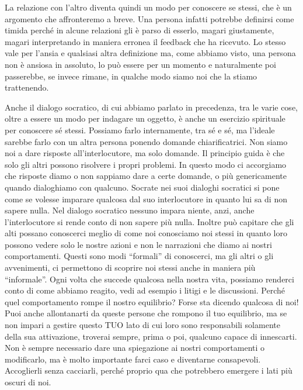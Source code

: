 \documentclass[12pt]{book} %
\begin{document}
\bigskip

La relazione con l'altro diventa quindi un modo per conoscere se stessi, che è un argomento che
affronteremo a breve. Una persona infatti potrebbe definirsi come timida perché in alcune relazioni gli è parso di
esserlo, magari giustamente, magari interpretando in maniera erronea il feedback che ha ricevuto. Lo stesso vale per
l'ansia e qualsiasi altra definizione ma, come abbiamo visto, una persona non è ansiosa in
assoluto, lo può essere per un momento e naturalmente poi passerebbe, se invece rimane, in qualche modo siamo noi che
la stiamo trattenendo.


\bigskip

Anche il dialogo socratico, di cui abbiamo parlato in precedenza, tra le varie cose, oltre a essere un modo per indagare
un oggetto, è anche un esercizio spirituale per conoscere sé stessi. Possiamo farlo internamente, tra sé e sé, ma
l'ideale sarebbe farlo con un altra persona ponendo domande chiarificatrici. Non siamo noi a dare
risposte all'interlocutore, ma solo domande. Il principio guida è che solo gli altri possono
risolvere i propri problemi. In questo modo ci accorgiamo che risposte diamo o non sappiamo dare a certe domande, o più
genericamente quando dialoghiamo con qualcuno. Socrate nei suoi dialoghi socratici si pone come se volesse imparare
qualcosa dal suo interlocutore in quanto lui sa di non sapere nulla. Nel dialogo socratico nessuno impara niente, anzi,
anche l'interlocutore si rende conto di non sapere più nulla. Inoltre può capitare che gli alti possano conoscerci
meglio di come noi conosciamo noi stessi in quanto loro possono vedere solo le nostre azioni e non le narrazioni che
diamo ai nostri comportamenti. Questi sono modi “formali” di conoscerci, ma gli altri o gli avvenimenti, ci permettono
di scoprire noi stessi anche in maniera più “informale”. Ogni volta che succede qualcosa nella nostra vita, possiamo
renderci conto di come abbiamo reagito, vedi ad esempio i litigi e le discussioni. Perché quel comportamento rompe il
nostro equilibrio? Forse sta dicendo qualcosa di noi! Puoi anche allontanarti da queste persone che rompono il tuo
equilibrio, ma se non impari a gestire questo TUO lato di cui loro sono responsabili solamente della sua attivazione,
troverai sempre, prima o poi, qualcuno capace di innescarti. Non è sempre necessario dare una spiegazione ai nostri
comportamenti o modificarlo, ma è molto importante farci caso e diventarne consapevoli. Accoglierli senza cacciarli,
perché proprio qua che potrebbero emergere i lati più oscuri di noi.
\end{document}

